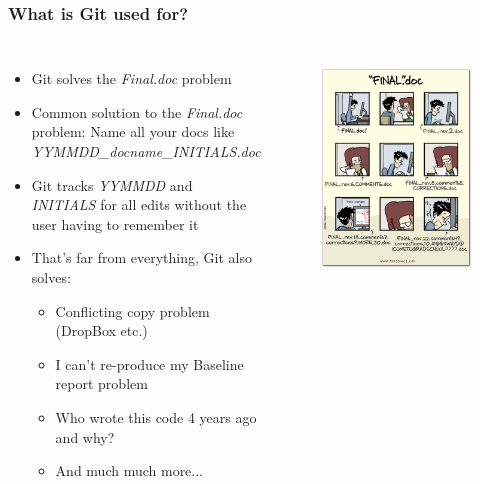 \documentclass[aspectratio=169]{beamer} %
\begin{document}
\begin{frame}
\frametitle{What is Git used for?}

	\begin{columns}[c]

		\begin{itemize}
			\item Git solves the \textit{Final.doc} problem
			\item <2->Common solution to the \textit{Final.doc} problem: Name all your docs like \textit{YYMMDD\_docname\_INITIALS.doc}
			\item <3->Git tracks \textit{YYMMDD} and \textit{INITIALS} for all edits  without the user having to remember it
			\item <4->That's far from everything, Git also solves:
			\begin{itemize}
				\item <4->Conflicting copy problem (DropBox etc.)
				\item <4->I can't re-produce my Baseline report problem
				\item <4->Who wrote this code 4 years ago and why?
				\item <4->And much much more...
			\end{itemize}
		\end{itemize}

		\begin{figure}
			\centering
			\includegraphics[width=1\linewidth]{../../Common-Resources/img/finaldoc_cartoon}
			\label{fig:finaldoccartoon}
		\end{figure}


\end{columns}
\end{frame}
\end{document}
